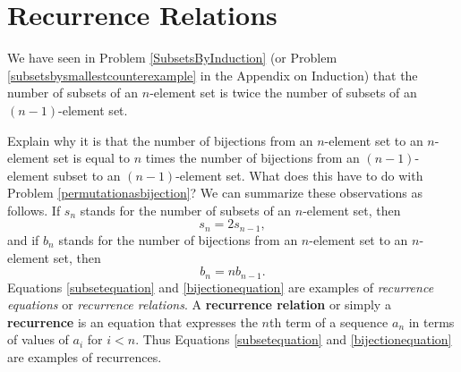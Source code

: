 \section{Recurrence Relations}  We have seen in 
Problem \ref{SubsetsByInduction} (or Problem 
\ref{subsetsbysmallestcounterexample} in the Appendix on Induction) that
the number of subsets of an $n$-element set is twice the number of
subsets of an $(n-1)$-element set.  
\bp \item Explain why it is that the number of
bijections from an $n$-element set to an $n$-element set is equal to $n$
times the number of bijections from an $(n-1)$-element subset to an
$(n-1)$-element set.  What does this have to do with Problem
\ref{permutationasbijection}?
\ep
We can summarize these observations as follows.  If $s_n$ stands for the
number of subsets of an $n$-element set, then 
\begin{equation} s_n =2s_{n-1},\label{subsetequation}\end{equation} and if
$b_n$ stands for the number of bijections from an $n$-element set to an
$n$-element set, then \begin{equation} b_n =
nb_{n-1}.\label{bijectionequation}\end{equation}
Equations \ref{subsetequation} and \ref{bijectionequation} are examples
of {\em recurrence equations} or {\em recurrence relations}.  A {\bf
recurrence relation} or simply a {\bf recurrence} is an equation
that expresses the $n$th term of a sequence $a_n$ in terms of values of
$a_i$ for $i<n$.  Thus Equations \ref{subsetequation} and
\ref{bijectionequation} are examples of recurrences. 

